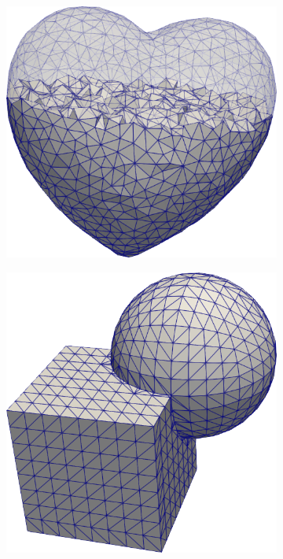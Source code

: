 \documentclass{ansarticle-preprint}
\begin{document}
\begin{figure}
  \centering
  \begin{subfigure}[b]{0.28\textwidth}
    \centering
    \includegraphics[width=\textwidth]{png/heart_implicit.png}
    \caption{\label{fig:heart_tria}}
  \end{subfigure}\qquad
  \hfill
  \begin{subfigure}[b]{0.28\textwidth}
    \centering
    \includegraphics[width=\textwidth]{png/intersection_cube_sphere_mesh.png}

\end{subfigure}
\end{figure}
\end{document}

